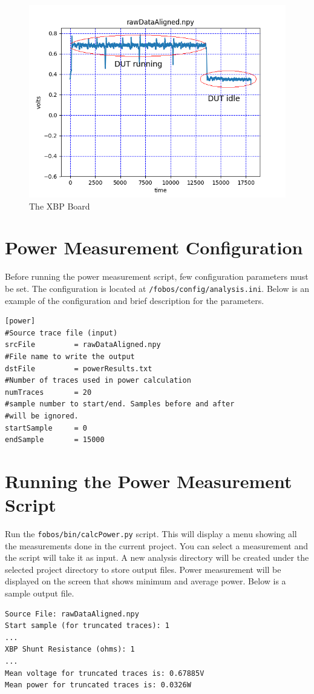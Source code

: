 \begin{figure} 
   \begin{center}
   \includegraphics[scale=0.6]{../figures/power.png}
   \caption{\label{fig:power}The XBP Board}
   \end{center}
\end{figure}

\newline


\section{Power Measurement Configuration}
Before running the power measurement script, few configuration  parameters must be set. 
The configuration is located at \texttt{/fobos/config/analysis.ini}. Below is an example of the configuration and brief description
for the parameters.


\begin{verbatim}
[power]
#Source trace file (input)
srcFile         = rawDataAligned.npy
#File name to write the output
dstFile         = powerResults.txt
#Number of traces used in power calculation
numTraces       = 20
#sample number to start/end. Samples before and after
#will be ignored.
startSample     = 0
endSample       = 15000
\end{verbatim}

\section{Running the Power Measurement Script}

Run the \texttt{fobos/bin/calcPower.py} script.
This will display a menu showing all the measurements done in the current project.
You can select a measurement and the script will take it as input. A new analysis directory will be created under the selected project directory to store output files.
Power measurement will be displayed on the screen that shows minimum and average power. Below is a sample output file.

\begin{verbatim}
Source File: rawDataAligned.npy
Start sample (for truncated traces): 1
...
XBP Shunt Resistance (ohms): 1
...
Mean voltage for truncated traces is: 0.67885V
Mean power for truncated traces is: 0.0326W
\end{verbatim}
